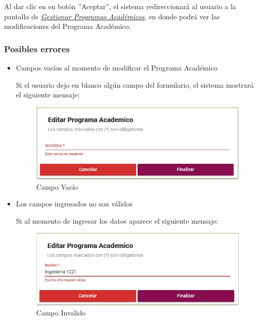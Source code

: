         Al dar clic en en botón ''Aceptar'', el sistema redireccionará al usuario a la pantalla de \hyperlink{consultarpa}{\textit{Gestionar Programas Académicos}}, en donde podrá ver las modificaciones del Programa Académico.\\

        \subsubsection{Posibles errores}

            \begin{itemize}
            	\item Campos vacíos al momento de modificar el Programa Académico

                	Si el usuario dejo en blanco algún campo del formulario, el sistema mostrará el siguiente mensaje:

                    \begin{figure}[!hbtp]
                    \centering
                    \hypertarget{vacio}{\includegraphics[width=0.7\linewidth]{images/SP3/Vacio}}
                    \caption{Campo Vacío}
                    \label{vacio}
                    \end{figure}

            	\item Los campos ingresados no son válidos

                	Si al momento de ingresar los datos aparece el siguiente mensaje:

                     \begin{figure}[!hbtp]
                    \centering
                    \hypertarget{invalido}{\includegraphics[width=0.7\linewidth]{images/SP3/Invalida}}
                    \caption{Campo Invalido}
                    \label{invalido}
                    \end{figure}



\end{itemize}
